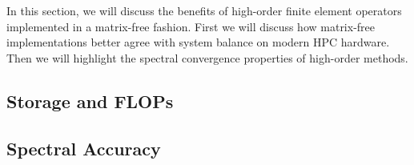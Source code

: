 In this section, we will discuss the benefits of high-order finite element operators implemented in a matrix-free fashion.
First we will discuss how matrix-free implementations better agree with system balance on modern HPC hardware.
Then we will highlight the spectral convergence properties of high-order methods.

\subsection{Storage and FLOPs}\label{sec:storageandflops}


\subsection{Spectral Accuracy}

